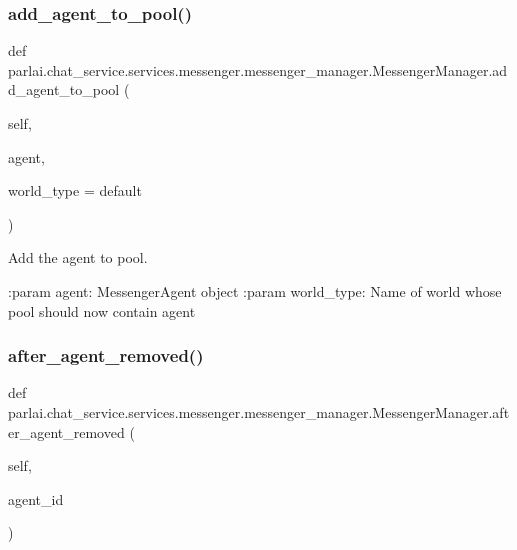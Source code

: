 \subsubsection{\texorpdfstring{add\+\_\+agent\+\_\+to\+\_\+pool()}{add\_agent\_to\_pool()}}
{\footnotesize\ttfamily def parlai.\+chat\+\_\+service.\+services.\+messenger.\+messenger\+\_\+manager.\+Messenger\+Manager.\+add\+\_\+agent\+\_\+to\+\_\+pool (\begin{DoxyParamCaption}\item[{}]{self,  }\item[{}]{agent,  }\item[{}]{world\+\_\+type = {\ttfamily \textquotesingle{}default\textquotesingle{}} }\end{DoxyParamCaption})}

\begin{DoxyVerb}Add the agent to pool.

:param agent:
    MessengerAgent object
:param world_type:
    Name of world whose pool should now contain agent
\end{DoxyVerb}
 \mbox{\label{classparlai_1_1chat__service_1_1services_1_1messenger_1_1messenger__manager_1_1MessengerManager_ade5e639c76e2c48815c079d515ecaf9b}} 
\subsubsection{\texorpdfstring{after\+\_\+agent\+\_\+removed()}{after\_agent\_removed()}}
{\footnotesize\ttfamily def parlai.\+chat\+\_\+service.\+services.\+messenger.\+messenger\+\_\+manager.\+Messenger\+Manager.\+after\+\_\+agent\+\_\+removed (\begin{DoxyParamCaption}\item[{}]{self,  }\item[{}]{agent\+\_\+id }\end{DoxyParamCaption})}

